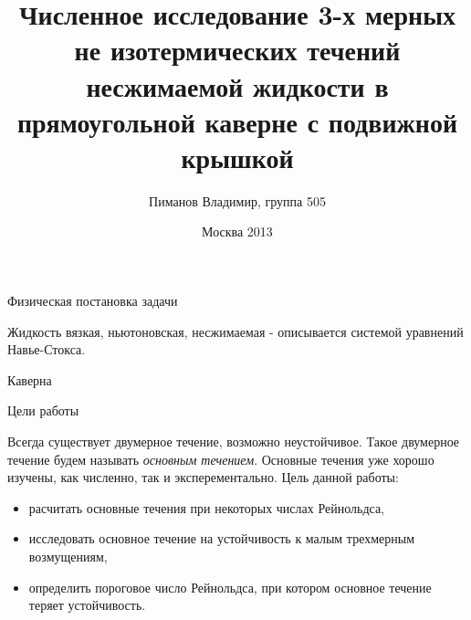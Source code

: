 \documentclass{beamer}
\begin{document}

\title[]{Численное исследование 3-х мерных не изотермических течений несжимаемой жидкости в прямоугольной каверне с подвижной крышкой}
 
\author{Пиманов Владимир, группа 505}


\date{Москва 2013} 
\frame{\titlepage} 

\begin{frame}{Физическая постановка задачи}
	\begin{block}{Жидкость}
		вязкая, ньютоновская, несжимаемая - описывается системой уравнений Навье-Стокса.
	\end{block}
\begin{block}{Каверна}
	\end{block}
\end{frame}

\begin{frame}{Цели работы}
	
		Всегда существует двумерное течение, возможно неустойчивое. Такое двумерное течение будем называть \textit{основным течением}. Основные течения уже хорошо изучены, как численно, так и эксперементально. Цель данной работы: 
	\begin{itemize}
		\item расчитать основные течения при некоторых числах Рейнольдса,
		\item исследовать основное течение на устойчивость к малым трехмерным возмущениям,
		\item определить пороговое число Рейнольдса, при котором основное течение теряет устойчивость.
	\end{itemize}
\end{frame}
\end{document}
